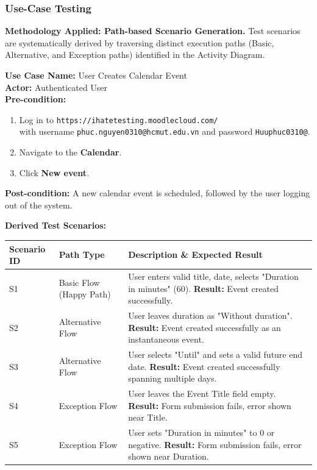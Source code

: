 \documentclass[twoside,final]{hcmut-report}
\begin{document}
\subsubsection{Use-Case Testing}
\textbf{Methodology Applied: Path-based Scenario Generation.} 
Test scenarios are systematically derived by traversing distinct execution paths (Basic, Alternative, and Exception paths) identified in the Activity Diagram.

\vspace{0.2cm}
\noindent\textbf{Use Case Name:} User Creates Calendar Event \\
\textbf{Actor:} Authenticated User \\
\textbf{Pre-condition:} 
\begin{enumerate}
    \item Log in to \texttt{https://ihatetesting.moodlecloud.com/}\\ with username \texttt{phuc.nguyen0310@hcmut.edu.vn} and password \texttt{Huuphuc0310@}.
    \item Navigate to the \textbf{Calendar}.
    \item Click \textbf{New event}.
\end{enumerate}
\textbf{Post-condition:} A new calendar event is scheduled, followed by the user logging out of the system.

\vspace{0.3cm}
\noindent\textbf{Derived Test Scenarios:}
\begin{table}[H]
\centering
\renewcommand{\arraystretch}{1.2}
\begin{tabularx}{\textwidth}{|l|l|X|}
\hline
\textbf{Scenario ID} & \textbf{Path Type} & \textbf{Description \& Expected Result} \\ \hline
S1 & Basic Flow (Happy Path) & User enters valid title, date, selects "Duration in minutes" (60). \textbf{Result:} Event created successfully. \\ \hline
S2 & Alternative Flow & User leaves duration as "Without duration". \textbf{Result:} Event created successfully as an instantaneous event. \\ \hline
S3 & Alternative Flow & User selects "Until" and sets a valid future end date. \textbf{Result:} Event created successfully spanning multiple days. \\ \hline
S4 & Exception Flow & User leaves the Event Title field empty. \textbf{Result:} Form submission fails, error shown near Title. \\ \hline
S5 & Exception Flow & User sets "Duration in minutes" to 0 or negative. \textbf{Result:} Form submission fails, error shown near Duration. \\ \hline
\end{tabularx}
\end{table}
\end{document}
